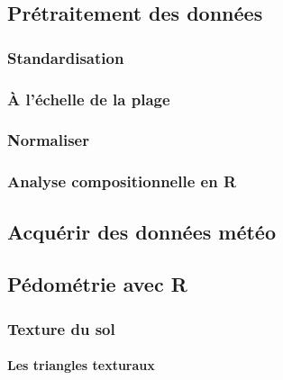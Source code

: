 \documentclass[]{book}
\let\oldparagraph\paragraph
\renewcommand{\paragraph}[1]{\oldparagraph{#1}\mbox{}}
\begin{document}
\hypertarget{pruxe9traitement-des-donnuxe9es}{%
\subsection{Prétraitement des
données}\label{pruxe9traitement-des-donnuxe9es}}

\hypertarget{standardisation}{%
\subsubsection{Standardisation}\label{standardisation}}

\hypertarget{uxe0-luxe9chelle-de-la-plage}{%
\subsubsection{À l'échelle de la
plage}\label{uxe0-luxe9chelle-de-la-plage}}

\hypertarget{normaliser}{%
\subsubsection{Normaliser}\label{normaliser}}

\hypertarget{analyse-compositionnelle-en-r}{%
\subsubsection{Analyse compositionnelle en
R}\label{analyse-compositionnelle-en-r}}

\hypertarget{acquuxe9rir-des-donnuxe9es-muxe9tuxe9o}{%
\subsection{Acquérir des données
météo}\label{acquuxe9rir-des-donnuxe9es-muxe9tuxe9o}}

\hypertarget{puxe9domuxe9trie-avec-r}{%
\subsection{Pédométrie avec R}\label{puxe9domuxe9trie-avec-r}}

\hypertarget{texture-du-sol}{%
\subsubsection{Texture du sol}\label{texture-du-sol}}

\hypertarget{les-triangles-texturaux}{%
\paragraph{Les triangles texturaux}\label{les-triangles-texturaux}}
\end{document}
